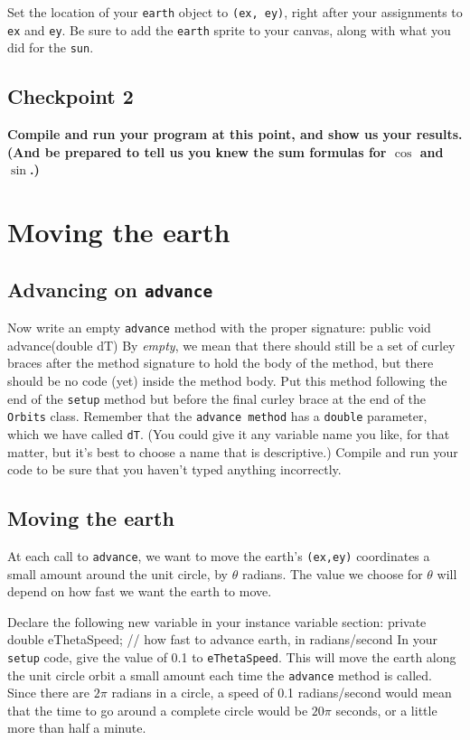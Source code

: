 \documentclass[11pt]{article}
\newenvironment{qv}%
  {\quote
   \verbatim}%
  {\endverbatim
   \endquote}
\begin{document}
Set the location of your {\tt earth} object to {\tt (ex, ey)},
right after your assignments to {\tt ex} and {\tt ey}.
Be sure to add the {\tt earth} sprite to your canvas,
along with what you did for the {\tt sun}.

\subsection*{Checkpoint 2}
{\bf
Compile and run your program at this point,
and show us your results.
(And be prepared to tell us
you knew the sum formulas for $\cos$ and $\sin$.)
}

\section*{Moving the earth}

\subsection*{Advancing on {\tt advance}}
Now write an empty {\tt advance} method
with the proper signature:
\begin{qv}
public void advance(double dT)
\end{qv}
By {\em empty}, we mean
that there should still be a set of curley braces
after the method signature
to hold the body of the method,
but there should be no code (yet) inside the method body.
Put this method following the end of the \verb'setup' method
but before the final curley brace at the end of the \verb'Orbits' class.
Remember that the {\tt advance method} has a {\tt double} parameter,
which we have called {\tt dT}.
(You could give it any variable name you like, for that matter,
but it's best to choose a name that is descriptive.)
Compile and run your code
to be sure that you haven't typed anything incorrectly.

\subsection*{Moving the earth}
At each call to {\tt advance},
we want to move the earth's {\tt (ex,ey)} coordinates
a small amount around the unit circle,
by $\theta$ radians.
The value we choose for $\theta$ will depend
on how fast we want the earth to move.

Declare the following new variable in your instance variable section:
\begin{qv}
private double eThetaSpeed; // how fast to advance earth, in radians/second
\end{qv}
In your {\tt setup} code,
give the value of 0.1 to \verb'eThetaSpeed'.
This will move the earth along the unit circle orbit a small amount
each time the {\tt advance} method is called.
Since there are $2\pi$ radians in a circle,
a speed of 0.1 radians/second would mean
that the time to go around a complete circle would be $20\pi$ seconds,
or a little more than half a minute.
\end{document}

